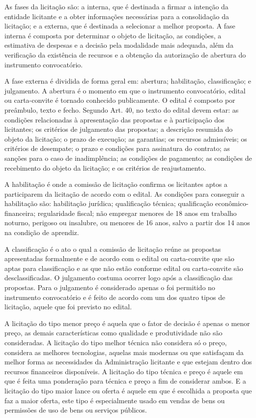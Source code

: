 As fases da licitação são: a interna, que é destinada a firmar a intenção da entidade licitante e a obter informações necessárias para a consolidação da licitação; e a externa, que é destinada a selecionar a melhor proposta. A fase interna é composta por determinar o objeto de licitação, as condições, a estimativa de despesas e a decisão pela modalidade mais adequada, além da verificação da existência de recursos e a obtenção da autorização de abertura do instrumento convocatório.

A fase externa é dividida de forma geral em: abertura; habilitação, classificação; e julgamento.  A abertura é o momento em que o instrumento convocatório, edital ou carta-convite é tornado conhecido publicamente. O edital é composto por preâmbulo, texto e fecho. Segundo Art. 40, no texto do edital devem estar: as condições relacionadas à apresentação das propostas e à participação dos licitantes; os critérios de julgamento das propostas; a descrição resumida do objeto da licitação; o prazo de execução; as garantias; os recursos admissíveis; os critérios de desempate;  o prazo e condições para assinatura do contrato; as sanções para o caso de inadimplência; as condições de pagamento; as condições de recebimento do objeto da licitação; e os critérios de reajustamento.

A habilitação é onde a comissão de licitação confirma os licitantes aptos a participarem da licitação de acordo com o edital. As condições para conseguir a habilitação são: habilitação jurídica; qualificação técnica; qualificação econômico-financeira; regularidade fiscal; não empregar menores de 18 anos em trabalho noturno, perigoso ou insalubre, ou menores de 16 anos, salvo a partir dos 14 anos na condição de aprendiz. 

A classificação é o ato o qual a comissão de licitação reúne as propostas apresentadas formalmente e de acordo com o edital ou carta-convite que são aptas para classificação e as que não estão conforme edital ou carta-convite são desclassificadas. O julgamento costuma ocorrer logo após a classificação das propostas. Para o julgamento é considerado apenas o foi permitido no instrumento convocatório e é feito de acordo com um dos quatro tipos de licitação, aquele que foi previsto no edital. 

A licitação do tipo menor preço é aquela que o fator de decisão é apenas o menor preço, as demais características como qualidade e produtividade não são consideradas. A licitação do tipo melhor técnica não considera só o preço, considera as melhores tecnologias, aquelas mais modernas ou que satisfaçam da melhor forma as necessidades da Administração licitante e que estejam dentro dos recursos financeiros disponíveis. A licitação do tipo técnica e preço é aquele em que é feita uma ponderação para técnica e preço a fim de considerar ambos. E a licitação do tipo maior lance ou oferta é aquele em que é escolhida a proposta que faz a maior oferta, este tipo é especialmente usado em vendas de bens ou permissões de uso de bens ou serviços públicos.

